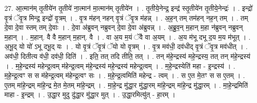 \documentclass[17pt]{extarticle}
\begin{document}
27. आ॒त्मान॑म् तृ॒तीये॑न तृ॒तीये॑ ना॒त्मान॑ मा॒त्मान॑म् तृ॒तीये॑न । . तृ॒तीये॒नेन्द्र॒ इन्द्र॑ स्तृ॒तीये॑न तृ॒तीये॒नेन्द्रः॑ । . इन्द्रो॑ वृ॒त्रं ॅवृ॒त्र मिन्द्र॒ इन्द्रो॑ वृ॒त्रम् । . वृ॒त्र म॑हन् नहन् वृ॒त्रं ॅवृ॒त्र म॑हन्न् । . अ॒ह॒न् तम् तम॑हन् नह॒न् तम् । . तम् दे॒वा दे॒वा स्तम् तम् दे॒वाः । . दे॒वा अ॑ब्रुवन् नब्रुवन् दे॒वा दे॒वा अ॑ब्रुवन्न् । . अ॒ब्रु॒व॒न् म॒हान् म॒हा न॑ब्रुवन् नब्रुवन् म॒हान् । . म॒हान्. वै वै म॒हान् म॒हान्. वै । . वा अ॒य म॒यं ॅवै वा अ॒यम् । . अ॒य म॑भू दभू द॒य म॒य म॑भूत् । . अ॒भू॒द् यो यो॑ ऽभू दभू॒द् यः । . यो वृ॒त्रं ॅवृ॒त्रं ॅयो यो वृ॒त्रम् । . वृ॒त्र मव॑धी॒ दव॑धीद् वृ॒त्रं ॅवृ॒त्र मव॑धीत् । . अव॑धी॒ दितीत्य व॑धी॒ दव॑धी॒ दिति॑ । . इति॒ तत् तदि तीति॒ तत् । . तन् म॑हे॒न्द्रस्य॑ महे॒न्द्रस्य॒ तत् तन् म॑हे॒न्द्रस्य॑ । . म॒हे॒न्द्रस्य॑ महेन्द्र॒त्वम् म॑हेन्द्र॒त्वम् म॑हे॒न्द्रस्य॑ महे॒न्द्रस्य॑ महेन्द्र॒त्वम् । . म॒हे॒न्द्रस्येति॑ महा - इ॒न्द्रस्य॑ । . म॒हे॒न्द्र॒त्वꣳ स स म॑हेन्द्र॒त्वम् म॑हेन्द्र॒त्वꣳ सः । . म॒हे॒न्द्र॒त्वमिति॑ महेन्द्र - त्वम् । . स ए॒त मे॒तꣳ स स ए॒तम् । . ए॒तम् मा॑हे॒न्द्रम् मा॑हे॒न्द्र मे॒त मे॒तम् मा॑हे॒न्द्रम् । . मा॒हे॒न्द्र मु॑द्धा॒र मु॑द्धा॒रम् मा॑हे॒न्द्रम् मा॑हे॒न्द्र मु॑द्धा॒रम् । . मा॒हे॒न्द्रमिति॑ माहा - इ॒न्द्रम् । . उ॒द्धा॒र मुदु दु॑द्धा॒र मु॑द्धा॒र मुत् । . उ॒द्धा॒रमित्यु॑त् - हा॒रम् । \newline
\end{document}
